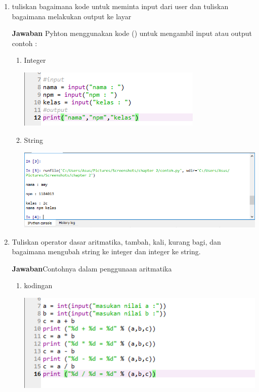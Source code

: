 \begin{enumerate}
\item
tuliskan bagaimana kode untuk meminta input dari user dan tuliskan bagaimana melakukan output ke layar
\par\textbf{Jawaban}
Pyhton menggunakan kode () untuk mengambil input atau output contoh :
\begin{enumerate}
    \item Integer
    \begin{center}
        \centering
        \includegraphics[scale=1.5]{figures/chapter 2/5.PNG}
    \end{center}

    \item String
    \begin{center}
        \centering
        \includegraphics[scale=0.5]{figures/chapter 2/6.PNG}
    \end{center}
    \end{enumerate}

\item
Tuliskan operator dasar aritmatika, tambah, kali, kurang bagi, dan 
bagaimana mengubah string ke integer dan integer ke string.
\par\textbf{Jawaban}Contohnya dalam penggunaan aritmatika
\begin{enumerate}
    \item kodingan
    \begin{center}
        \centering
        \includegraphics[scale=1]{figures/chapter 2/7.PNG}
    \end{center}
    

\end{enumerate}
\end{enumerate}
